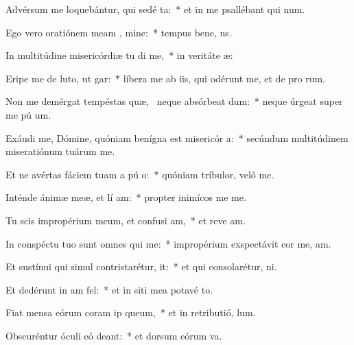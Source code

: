 \item Advérsum me loquebántur, qui sedé  ta:~* et in me psallébant qui  num.
\item Ego vero oratiónem meam  , mine:~* tempus bene, us.
\item In multitúdine misericórdiæ tu di me,~* in veritáte  æ:
\item Eripe me de luto, ut  gar:~* líbera me ab iis, qui odérunt me, et de pro rum.
\item Non me demérgat tempéstas quæ,~\pscross{} neque absórbeat  dum:~* neque úrgeat super me pú  um.
\item Exáudi me, Dómine, quóniam benígna est misericór a:~* secúndum multitúdinem miseratiónum tuárum   me.
\item Et ne avértas fáciem tuam a pú o:~* quóniam tríbulor, veló  me.
\item Inténde ánimæ meæ, et lí am:~* propter inimícos me  me.
\item Tu scis impropérium meum, et confusi am,~* et reve am.
\item In conspéctu tuo sunt omnes qui  me:~* impropérium exspectávit cor me,  am.
\item Et sustínui qui simul contristarétur,   it:~* et qui consolarétur,   ni.
\item Et dedérunt in  am fel:~* et in siti mea potavé  to.
\item Fiat mensa eórum coram ip  queum,~* et in retributió,   lum.
\item Obscuréntur óculi eó  deant:~* et dorsum eórum  va.
